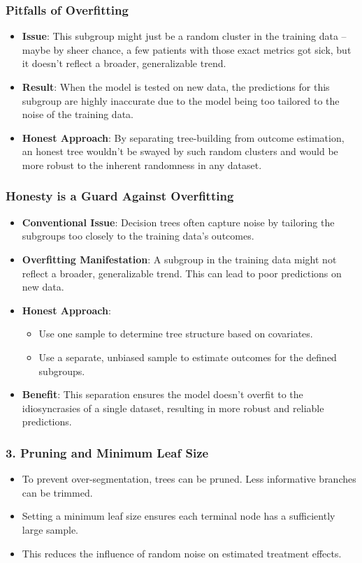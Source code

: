 \documentclass{beamer}
\begin{document}
\begin{frame}
\frametitle{Pitfalls of Overfitting}
\begin{itemize}
\item \textbf{Issue}: This subgroup might just be a random cluster in the training data -- maybe by sheer chance, a few patients with those exact metrics got sick, but it doesn't reflect a broader, generalizable trend.
\item \textbf{Result}: When the model is tested on new data, the predictions for this subgroup are highly inaccurate due to the model being too tailored to the noise of the training data.
\item \textbf{Honest Approach}: By separating tree-building from outcome estimation, an honest tree wouldn't be swayed by such random clusters and would be more robust to the inherent randomness in any dataset.
\end{itemize}
\end{frame}

\begin{frame}
\frametitle{Honesty is a Guard Against Overfitting}
\begin{itemize}
\item \textbf{Conventional Issue}: Decision trees often capture noise by tailoring the subgroups too closely to the training data's outcomes.
\item \textbf{Overfitting Manifestation}: A subgroup in the training data might not reflect a broader, generalizable trend. This can lead to poor predictions on new data.
\item \textbf{Honest Approach}:
\begin{itemize}
\item Use one sample to determine tree structure based on covariates.
\item Use a separate, unbiased sample to estimate outcomes for the defined subgroups.
\end{itemize}
\item \textbf{Benefit}: This separation ensures the model doesn't overfit to the idiosyncrasies of a single dataset, resulting in more robust and reliable predictions.
\end{itemize}
\end{frame}



\begin{frame}
\frametitle{3. Pruning and Minimum Leaf Size}
\begin{itemize}
\item To prevent over-segmentation, trees can be pruned. Less informative branches can be trimmed.
\item Setting a minimum leaf size ensures each terminal node has a sufficiently large sample.
\item This reduces the influence of random noise on estimated treatment effects.
\end{itemize}
\end{frame}
\end{document}
